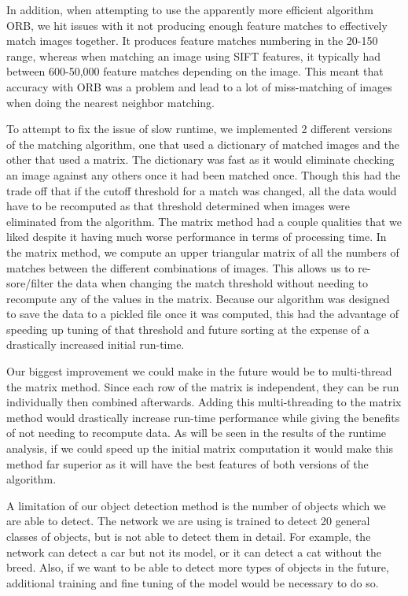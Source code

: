 \documentclass[12pt]{article}
\begin{document}
	In addition, when attempting to use the apparently more efficient algorithm ORB, we hit issues with it not producing enough feature matches to effectively match images together. It produces feature matches numbering in the 20-150 range, whereas when matching an image using SIFT features, it typically had between 600-50,000 feature matches depending on the image. This meant that accuracy with ORB was a problem and lead to a lot of miss-matching of images when doing the nearest neighbor matching.

	To attempt to fix the issue of slow runtime, we implemented 2 different versions of the matching algorithm, one that used a dictionary of matched images and the other that used a matrix. The dictionary was fast as it would eliminate checking an image against any others once it had been matched once. Though this had the trade off that if the cutoff threshold for a match was changed, all the data would have to be recomputed as that threshold determined when images were eliminated from the algorithm. The matrix method had a couple qualities that we liked despite it having much worse performance in terms of processing time. In the matrix method, we compute an upper triangular matrix of all the numbers of matches between the different combinations of images. This allows us to re-sore/filter the data when changing the match threshold without needing to recompute any of the values in the matrix. Because our algorithm was designed to save the data to a pickled file once it was computed, this had the advantage of speeding up tuning of that threshold and future sorting at the expense of a drastically increased initial run-time. 
	
	Our biggest improvement we could make in the future would be to multi-thread the matrix method. Since each row of the matrix is independent, they can be run individually then combined afterwards. Adding this multi-threading to the matrix method would drastically increase run-time performance while giving the benefits of not needing to recompute data. As will be seen in the results of the runtime analysis, if we could speed up the initial matrix computation it would make this method far superior as it will have the best features of both versions of the algorithm.
	
	
	
	A limitation of our object detection method is the number of objects which we are able to detect. The network we are using is trained to detect 20 general classes of objects, but is not able to detect them in detail. For example, the network can detect a car but not its model, or it can detect a cat without the breed. Also, if we want to be able to detect more types of objects in the future, additional training and fine tuning of the model would be necessary to do so.
	
\end{document}
